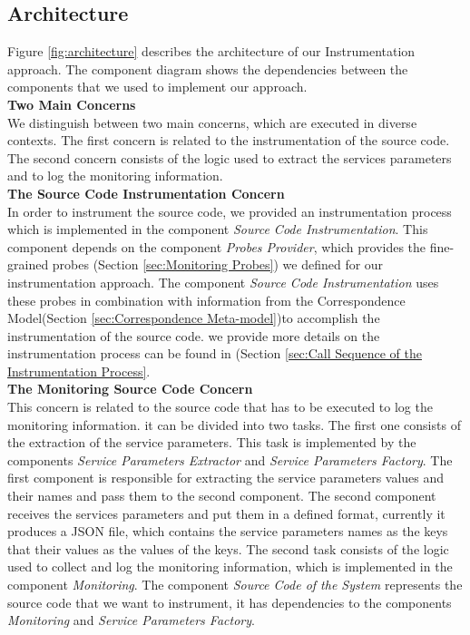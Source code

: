 \subsection{Architecture}
\label{sec:architecture}
Figure \ref{fig:architecture} describes the architecture of our Instrumentation approach. The component diagram shows the dependencies between the components that we used to implement our approach. \\

\textbf{Two Main Concerns}\\
We distinguish between two main concerns, which are executed in diverse contexts. The first concern is related to the instrumentation of the source code. The second concern consists of the logic used to extract the services parameters and to log the monitoring information.  \\

\textbf{The Source Code Instrumentation Concern}\\
In order to instrument the source code, we provided an instrumentation process which is implemented in the component \textit{Source Code Instrumentation}. This component depends on the component \textit{Probes Provider}, which provides the fine-grained probes (Section \ref{sec:Monitoring Probes}) we defined for our instrumentation approach. The component \textit{Source Code Instrumentation} uses these probes in combination with information from the Correspondence Model(Section \ref{sec:Correspondence Meta-model})to accomplish the instrumentation of the source code. we provide more details on the instrumentation process can be found in (Section \ref{sec:Call Sequence of the Instrumentation Process}.\\


\textbf{The Monitoring Source Code Concern}\\
This concern is related to the source code that has to be executed to log the monitoring information. it can be divided into two tasks. The first one consists of the extraction of the service parameters. This task is implemented by the components \textit{Service Parameters Extractor} and \textit{Service Parameters Factory}. The first component is responsible for extracting the service parameters values and their names and pass them to the second component. The second component receives the services parameters and put them in a defined format, currently it produces a JSON file, which contains the service parameters names as the keys that their values as the values of the keys. The second task consists of the logic used to collect and log the monitoring information, which is implemented in the component \textit{Monitoring}. The component \textit{Source Code of the System} represents the source code that we want to instrument, it has dependencies to the components \textit{Monitoring} and \textit{Service Parameters Factory}.\\ 

